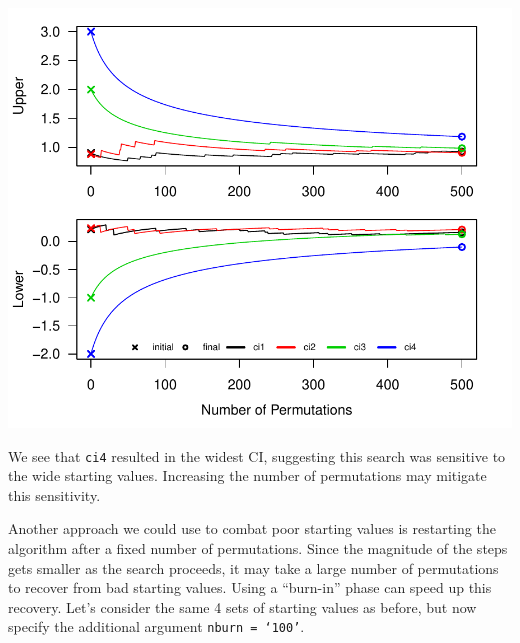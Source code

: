 \documentclass[12pt]{article}\usepackage[]{graphicx}\usepackage[]{color}
\makeatletter
\def\maxwidth{ %
  \ifdim\Gin@nat@width>\linewidth
    \linewidth
  \else
    \Gin@nat@width
  \fi
}
\newenvironment{knitrout}{}{} %
\makeatother
\begin{document}
\begin{knitrout}
\color{fgcolor}

{\centering \includegraphics[width=\maxwidth]{figure/ci_plots-1} 

}



\end{knitrout}
We see that \texttt{ci4} resulted in the widest CI, suggesting this search was sensitive to the wide starting values. Increasing the number of permutations may mitigate this sensitivity.

Another approach we could use to combat poor starting values is restarting the algorithm after a fixed number of permutations. Since the magnitude of the steps gets smaller as the search proceeds, it may take a large number of permutations to recover from bad starting values. Using a ``burn-in'' phase can speed up this recovery. Let's consider the same 4 sets of starting values as before, but now specify the additional argument \texttt{nburn = `100'}.
\end{document}
